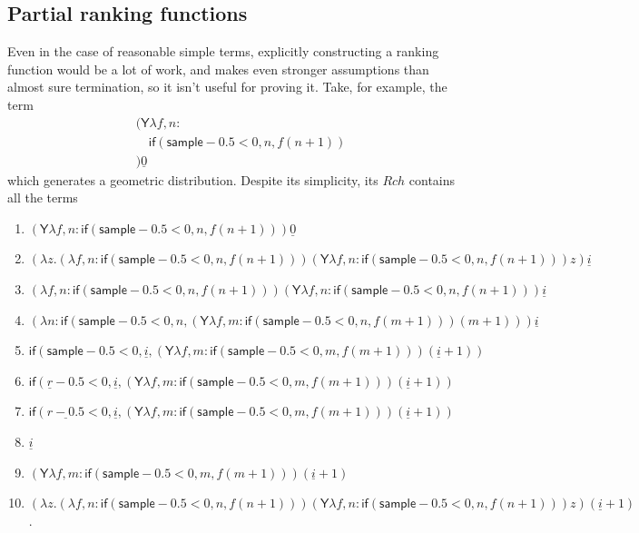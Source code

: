 \documentclass{article}
\newcommand{\tY}{\mathsf{Y}}
\newcommand{\tif}[3]{\mathsf{if}(#1, #2, #3)} %
\newcommand{\tsample}{\mathsf{sample}}
\theoremstyle{definition}
\theoremstyle{lemma}
\theoremstyle{remark}
\begin{document}
\subsection{Partial ranking functions}
Even in the case of reasonable simple terms, explicitly constructing a ranking function would be a lot of work, and  makes even stronger assumptions than almost sure termination, so it isn't useful for proving it. Take, for example, the term
\begin{align*}
&(\tY \lambda f, n: \\
&\quad \tif{\tsample - 0.5 < 0}{n}{f (n+1)} \\
&) \underline{0}
\end{align*}
which generates a geometric distribution.
    Despite its simplicity, its $Rch$ contains all the terms
\begin{enumerate}
    \item $(\tY \lambda f, n: \tif{\tsample - 0.5 < 0}{n}{f (n+1)}) \underline{0}$
    \item $(\lambda z.(\lambda f, n: \tif{\tsample - 0.5 < 0}{n}{f (n+1)}) (\tY \lambda f, n: \tif{\tsample - 0.5 < 0}{n}{f (n+1)}) z) \underline{i}$
    \item $(\lambda f, n: \tif{\tsample - 0.5 < 0}{n}{f (n+1)}) (\tY \lambda f, n: \tif{\tsample - 0.5 < 0}{n}{f (n+1)}) \underline{i}$
    \item $(\lambda n: \tif{\tsample - 0.5 < 0}{n}{(\tY \lambda f, m: \tif{\tsample - 0.5 < 0}{n}{f (m+1)}) (m+1)}) \underline{i}$
    \item $\tif{\tsample - 0.5 < 0}{\underline{i}}{(\tY \lambda f, m: \tif{\tsample - 0.5 < 0}{m}{f (m+1)}) (\underline{i}+1)}$
    \item $\tif{\underline r - 0.5 < 0}{\underline{i}}{(\tY \lambda f, m: \tif{\tsample - 0.5 < 0}{m}{f (m+1)}) (\underline{i}+1)}$
    \item $\tif{\underline{r - 0.5} < 0}{\underline{i}}{(\tY \lambda f, m: \tif{\tsample - 0.5 < 0}{m}{f (m+1)}) (\underline{i}+1)}$
    \item $\underline{i}$
    \item $(\tY \lambda f, m: \tif{\tsample - 0.5 < 0}{m}{f (m+1)}) (\underline{i}+1)$
    \item $(\lambda z.(\lambda f, n: \tif{\tsample - 0.5 < 0}{n}{f (n+1)}) (\tY \lambda f, n: \tif{\tsample - 0.5 < 0}{n}{f (n+1)}) z) (\underline{i} + 1)$.
\end{enumerate}
\end{document}
